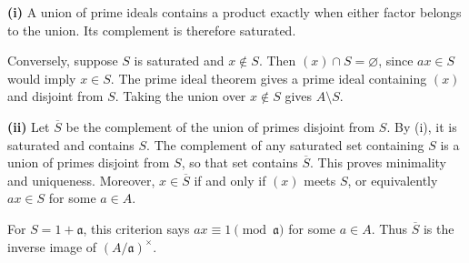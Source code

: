 \textbf{(i)} A union of prime ideals contains a product exactly when either factor belongs to the union. Its complement is therefore saturated.

Conversely, suppose $S$ is saturated and $x\notin S$. Then $(x)\cap S=\varnothing$, since $ax\in S$ would imply $x\in S$. The prime ideal theorem gives a prime ideal containing $(x)$ and disjoint from $S$. Taking the union over $x\notin S$ gives $A\setminus S$.

\textbf{(ii)} Let $\overline S$ be the complement of the union of primes disjoint from $S$. By (i), it is saturated and contains $S$. The complement of any saturated set containing $S$ is a union of primes disjoint from $S$, so that set contains $\overline S$. This proves minimality and uniqueness. Moreover, $x\in\overline S$ if and only if $(x)$ meets $S$, or equivalently $ax\in S$ for some $a\in A$.

For $S=1+\mathfrak a$, this criterion says $ax\equiv1\pmod{\mathfrak a}$ for some $a\in A$. Thus $\overline S$ is the inverse image of $(A/\mathfrak a)^\times$.
